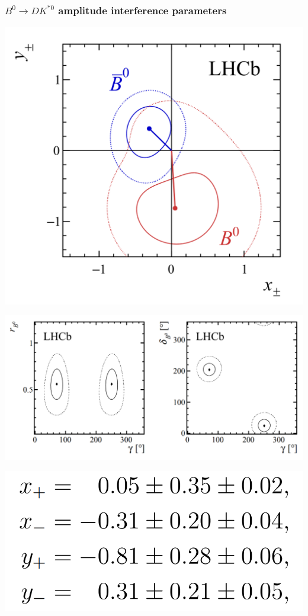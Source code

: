 \documentclass[10pt, aspectratio=169]{beamer}
\def\Kstarz{{K^{*0}}{}}
\def\Bz{{B^0}}
\begin{document}
\begin{frame}[label=B2DKstar-results]%
  \frametitle{$\Bz\to D\Kstarz$ amplitude interference parameters}
  \centering
  \parbox{.34\linewidth}{
    \includegraphics[width=\linewidth]{figures/lect/B2DKstar-results-xy}
  } \parbox{.65\linewidth}{
    \includegraphics[width=\linewidth]{figures/lect/B2DKstar-results-phys}
  }
  \parbox{.3\linewidth}{
    \includegraphics[width=\linewidth]{figures/lect/B2DKstar-results-xy-txt}
}
\end{frame}
\end{document}
